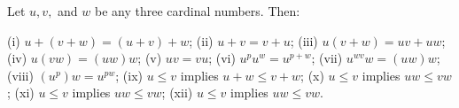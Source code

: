Let $u, v,$ and $w$ be any three cardinal numbers. Then:

(i) $u + (v + w) = (u + v) + w$;
(ii) $u + v = v + u$;
(iii) $u(v + w) = uv + uw$;
(iv) $u(vw) = (uw)w$;
(v) $uv = vu$;
(vi) $u^p u^w = u^{p+w}$;
(vii) $u^{wv}w = (uw)w$;
(viii) $(u^p)w = u^{pw}$;
(ix) $u \leq v$ implies $u + w \leq v + w$;
(x) $u \leq v$ implies $uw \leq vw$;
(xi) $u \leq v$ implies $uw \leq vw$;
(xii) $u \leq v$ implies $uw \leq vw$.